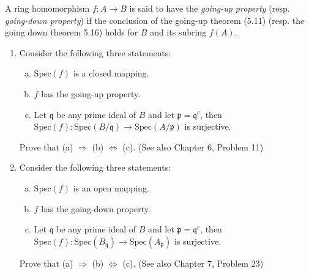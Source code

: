 \documentclass{solution}
\begin{document}
\begin{problem}
    A ring homomorphism $f: A \rightarrow B$ is said to have the \textit{going-up property} (resp. \textit{going-down property}) if the conclusion of the going-up theorem (5.11) (resp. the going down theorem 5.16) holds for $B$ and its subring $f(A)$.

    \begin{enumerate}
        \item Consider the following three statements:
        \begin{enumerate}[(a)]
            \item $\mathrm{Spec}(f)$ is a closed mapping.
            \item $f$ has the going-up property.
            \item Let $\mathfrak{q}$ be any prime ideal of $B$ and let $\mathfrak{p} = \mathfrak{q}^c$, then $\mathrm{Spec}(f): \mathrm{Spec}(B / \mathfrak{q}) \rightarrow \mathrm{Spec}(A / \mathfrak{p})$ is surjective.
        \end{enumerate}
        Prove that (a) $\Rightarrow$ (b) $\Leftrightarrow$ (c). (See also Chapter 6, Problem 11)
        \item Consider the following three statements:
        \begin{enumerate}[(a)]
            \item $\mathrm{Spec}(f)$ is an open mapping.
            \item $f$ has the going-down property.
            \item Let $\mathfrak{q}$ be any prime ideal of $B$ and let $\mathfrak{p} = \mathfrak{q}^c$, then $\mathrm{Spec}(f): \mathrm{Spec}(B_{\mathfrak{q}}) \rightarrow \mathrm{Spec}(A_\mathfrak{p})$ is surjective.
        \end{enumerate}
        Prove that (a) $\Rightarrow$ (b) $\Leftrightarrow$ (c). (See also Chapter 7, Problem 23)
    \end{enumerate}
\end{problem}
\end{document}
